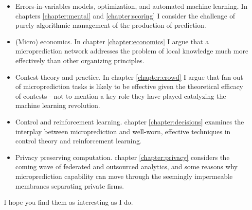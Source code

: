 \begin{itemize}
  \item Errors-in-variables models, optimization, and automated machine learning. In chapters \ref{chapter:mental} and  \ref{chapter:scoring} I consider the challenge of purely algorithmic management of the production of prediction. 
  \item (Micro) economics. In chapter \ref{chapter:economics} I argue that a microprediction network addresses the problem of local knowledge much more effectively than other organizing principles.  
   \item Contest theory and practice. In chapter \ref{chapter:crowd} I argue that fan out of microprediction tasks is likely to be effective given the theoretical efficacy of contests - not to mention a key role they have played catalyzing the machine learning revolution.
    \item Control and reinforcement learning. chapter \ref{chapter:decisions} examines the interplay between microprediction and well-worn, effective techniques in control theory and reinforcement learning. 
    \item Privacy preserving computation. chapter \ref{chapter:privacy} considers the coming wave of federated and outsourced analytics, and some reasons why microprediction capability can move through the seemingly impermeable membranes separating private firms.  
  \end{itemize}

I hope you find them as interesting as I do. 






